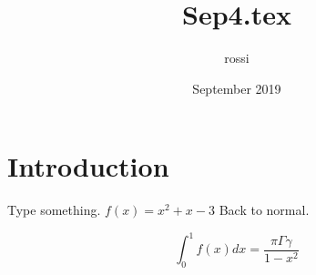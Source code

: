 \documentclass{article}
\title{Sep4.tex}
\author{rossi }
\date{September 2019}
\begin{document}
\maketitle

\section{Introduction}

\Large

Type something.  $f(x) = x^2 + x - 3$  Back to normal.

\[
\int_0^1 f(x) dx = \frac{\pi \Gamma \gamma}{1-x^2}
\]
\end{document}
